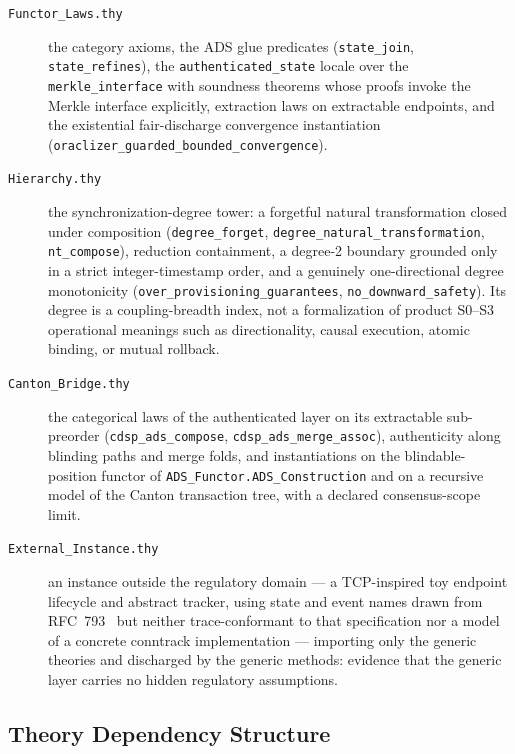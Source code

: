 \documentclass[11pt,a4paper]{article}
\begin{document}
\begin{description}
\item[\texttt{Functor\_Laws.thy}] the category axioms, the ADS glue
  predicates (\texttt{state\_join}, \texttt{state\_refines}), the
  \texttt{authenticated\_state} locale over the \texttt{merkle\_interface}
  with soundness theorems whose proofs invoke the Merkle interface
  explicitly, extraction laws on extractable endpoints, and the existential
  fair-discharge convergence instantiation
  (\texttt{oraclizer\_guarded\_bounded\_convergence}).

\item[\texttt{Hierarchy.thy}] the synchronization-degree tower: a
  forgetful natural transformation closed under composition
  (\texttt{degree\_forget}, \texttt{degree\_natural\_transformation},
  \texttt{nt\_compose}), reduction containment, a degree-2 boundary grounded
  only in a strict integer-timestamp order, and a genuinely
  one-directional degree monotonicity
  (\texttt{over\_provisioning\_guarantees}, \texttt{no\_downward\_safety}).
  Its degree is a coupling-breadth index, not a formalization of product
  S0--S3 operational meanings such as directionality, causal execution,
  atomic binding, or mutual rollback.

\item[\texttt{Canton\_Bridge.thy}] the categorical laws of the
  authenticated layer on its extractable sub-preorder
  (\texttt{cdsp\_ads\_compose}, \texttt{cdsp\_ads\_merge\_assoc}),
  authenticity along blinding paths and merge folds, and
  instantiations on the blindable-position functor of
  \texttt{ADS\_Functor.ADS\_Construction} and on a recursive model of the
  Canton transaction tree, with a declared consensus-scope limit.

\item[\texttt{External\_Instance.thy}] an instance outside the regulatory
  domain --- a TCP-inspired toy endpoint lifecycle and abstract tracker,
  using state and event names drawn from RFC~793~\cite{rfc793} but neither
  trace-conformant to that specification nor a model of a concrete conntrack
  implementation --- importing only the generic theories and discharged by
  the generic methods: evidence that the generic layer carries no hidden
  regulatory assumptions.
\end{description}

\subsection{Theory Dependency Structure}
\end{document}
